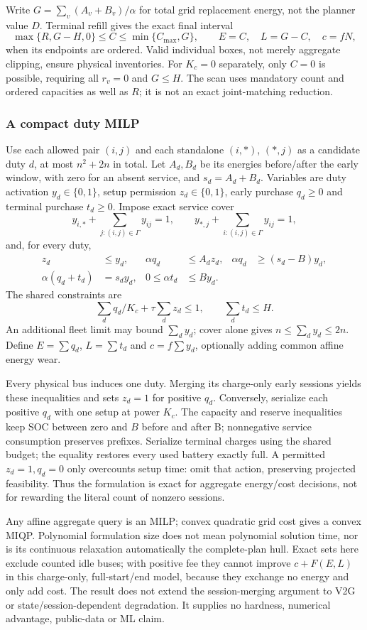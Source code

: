 Write $G=\sum_v(A_v+B_v)/\alpha$ for total grid replacement energy,
not the planner value $D$. Terminal refill gives the exact final interval
\[
 \max\{R,G-H,0\}\le C\le\min\{C_{\max},G\},
 \qquad E=C,\quad L=G-C,\quad c=fN,
\]
when its endpoints are ordered. Valid individual boxes, not merely
aggregate clipping, ensure physical inventories. For $K_c=0$ separately,
only $C=0$ is possible, requiring all $r_v=0$ and $G\le H$.
The scan uses mandatory count and ordered capacities as well as $R$;
it is not an exact joint-matching reduction.

\subsubsection{A compact duty MILP}
Use each allowed pair $(i,j)$ and each standalone $(i,*)$, $(*,j)$
as a candidate duty $d$, at most $n^2+2n$ in total. Let $A_d,B_d$ be
its energies before/after the early window, with zero for an absent
service, and $s_d=A_d+B_d$. Variables are duty activation $y_d\in\{0,1\}$,
setup permission $z_d\in\{0,1\}$, early purchase $q_d\ge0$ and terminal
purchase $t_d\ge0$. Impose exact service cover
\[
 y_{i,*}+\sum_{j:(i,j)\in\Gamma}y_{ij}=1,\qquad
 y_{*,j}+\sum_{i:(i,j)\in\Gamma}y_{ij}=1,
\]
and, for every duty,
\begin{align*}
 z_d&\le y_d,&\alpha q_d&\le A_dz_d,&
 \alpha q_d&\ge(s_d-B)y_d,\\
 \alpha(q_d+t_d)&=s_dy_d,&0\le\alpha t_d&\le By_d.
\end{align*}
The shared constraints are
\[
 \sum_d q_d/K_c+\tau\sum_dz_d\le1,\qquad
 \sum_dt_d\le H.
\]
An additional fleet limit may bound $\sum_dy_d$; cover alone gives
$n\le\sum_dy_d\le2n$. Define $E=\sum q_d$, $L=\sum t_d$ and
$c=f\sum y_d$, optionally adding common affine energy wear.

Every physical bus induces one duty. Merging its charge-only early
sessions yields these inequalities and sets $z_d=1$ for positive $q_d$.
Conversely, serialize each positive $q_d$ with one setup at power $K_c$.
The capacity and reserve inequalities keep SOC between zero and $B$
before and after B; nonnegative service consumption preserves prefixes.
Serialize terminal charges using the shared budget; the equality restores
every used battery exactly full. A permitted $z_d=1,q_d=0$ only
overcounts setup time: omit that action, preserving projected feasibility.
Thus the formulation is exact for aggregate energy/cost decisions, not
for rewarding the literal count of nonzero sessions.

Any affine aggregate query is an MILP; convex quadratic grid cost gives
a convex MIQP. Polynomial formulation size does not mean polynomial
solution time, nor is its continuous relaxation automatically the
complete-plan hull. Exact sets here exclude counted idle buses; with
positive fee they cannot improve $c+F(E,L)$ in this charge-only,
full-start/end model, because they exchange no energy and only add cost.
The result does not extend the session-merging argument to V2G or
state/session-dependent degradation. It supplies no hardness, numerical
advantage, public-data or ML claim.

